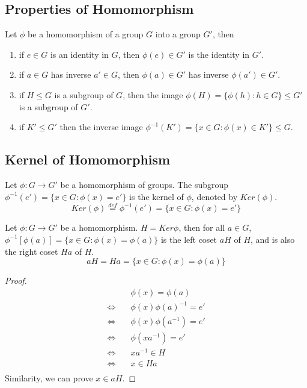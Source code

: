 \documentclass[11pt]{elegantbook}
\begin{document}
\subsection{Properties of Homomorphism}
\begin{theorem}
    Let $\phi$ be a homomorphism of a group $G$ into a group $G'$, then
\end{theorem}
\begin{enumerate}
    \item if $e\in G$ is an identity in $G$, then $\phi(e)\in G'$ is the identity in $G'$.
    \item if $a\in G$ has inverse $a'\in G$, then $\phi(a)\in G'$ has inverse $\phi(a')\in G'$.
    \item if $H\leq G$ is a subgroup of $G$, then the image $\phi(H)=\{\phi(h):h\in G\}\leq G'$ is a subgroup of $G'$.
    \item if $K'\leq G'$ then the inverse image $\phi^{-1}(K')=\{x\in G:\phi(x)\in K'\}\leq G$.
\end{enumerate}


\subsection{Kernel of Homomorphism}
\begin{definition}
    Let $\phi: G \rightarrow G'$ be a homomorphism of groups. The subgroup $\phi^{-1}(e')=\{x\in G:\phi(x)=e'\}$ is the kernel of $\phi$, denoted by $Ker (\phi)$.
    $$Ker (\phi) \stackrel{def}{=} \phi^{-1}(e')=\{x\in G:\phi(x)=e'\}$$
\end{definition}

\begin{theorem}
Let $\phi: G \rightarrow G'$ be a homomorphism. $H=Ker\phi$, then for all $a\in G$, $\phi^{-1}[\phi(a)]=\{x\in G:\phi(x)=\phi(a)\}$ is the left coset $aH$ of $H$, and is also the right coset $Ha$ of $H$.
$$aH=Ha=\{x\in G:\phi(x)=\phi(a)\}$$
\end{theorem}
\begin{proof}
\begin{equation}
    \begin{aligned}
        &\phi(x)=\phi(a)\\
        \Leftrightarrow\quad	&\phi(x)\phi(a)^{-1}=e'\\
        \Leftrightarrow\quad	&\phi(x)\phi(a^{-1})=e'\\
        \Leftrightarrow\quad	&\phi(xa^{-1})=e'\\
        \Leftrightarrow\quad	&xa^{-1}\in H\\
        \Leftrightarrow\quad	&x\in Ha\\
    \end{aligned}
    \nonumber
\end{equation}
Similarity, we can prove $x\in aH$.
\end{proof}
\end{document}
